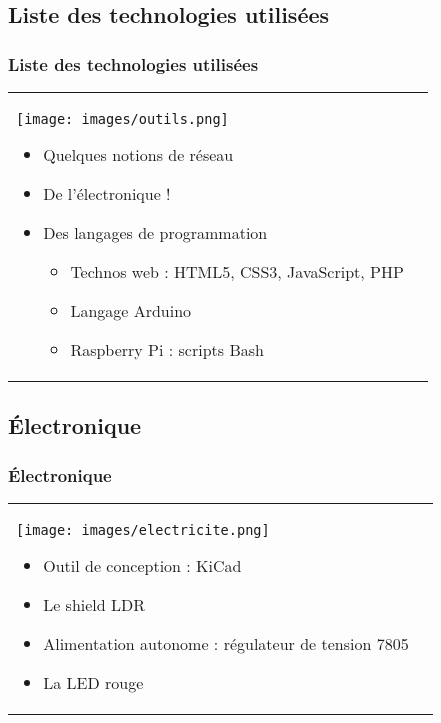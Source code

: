 \documentclass[handout]{beamer}
\begin{document}
	\subsection{Liste des technologies utilisées}
		\begin{frame}
		\frametitle{Liste des technologies utilisées}

		\begin{tabular}{l l}
			\begin{minipage}{0.2\textwidth}
				\begin{center}
					\texttt{[image: images/outils.png]}
				\end{center}
			\end{minipage}

			\begin{minipage}{0.8\textwidth}
				\begin{itemize}
					\item Quelques notions de réseau
					\item De l'électronique !
					\item Des langages de programmation
					\begin{itemize}
						\item Technos web : HTML5, CSS3, JavaScript, PHP
						\item Langage Arduino
						\item Raspberry Pi : scripts Bash
					\end{itemize}
				\end{itemize}
			\end{minipage}
			
		\end{tabular}
		\end{frame}

	\subsection{Électronique}
		\begin{frame}
		\frametitle{Électronique}

		\begin{tabular}{l l}
			\begin{minipage}{0.2\textwidth}
				\begin{center}
					\texttt{[image: images/electricite.png]}
				\end{center}
			\end{minipage}

			\begin{minipage}{0.8\textwidth}
				\begin{itemize}
					\item Outil de conception : KiCad
					\item Le shield LDR
					\item Alimentation autonome : régulateur de tension 7805
					\item La LED rouge
				\end{itemize}
			\end{minipage}
			
		\end{tabular}
		\end{frame}
\end{document}
